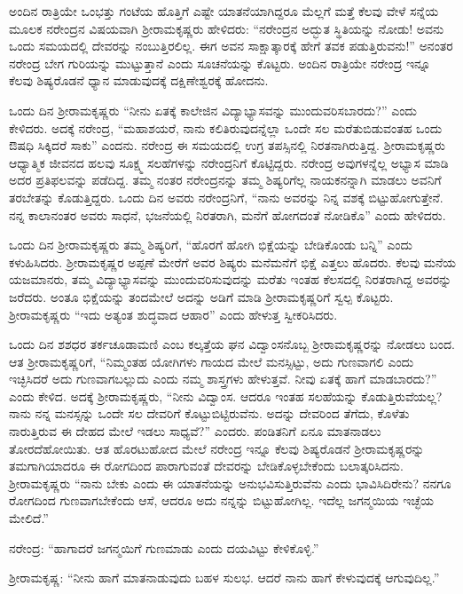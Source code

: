 ಅಂದಿನ ರಾತ್ರಿಯೇ ಒಂಭತ್ತು ಗಂಟೆಯ ಹೊತ್ತಿಗೆ ಎಷ್ಟೇ ಯಾತನೆಯಾಗಿದ್ದರೂ ಮೆಲ್ಲಗೆ ಮತ್ತೆ ಕೆಲವು ವೇಳೆ ಸನ್ನೆಯ ಮೂಲಕ ನರೇಂದ್ರನ ವಿಷಯವಾಗಿ ಶ‍್ರೀರಾಮಕೃಷ್ಣರು ಹೇಳಿದರು: “ನರೇಂದ್ರನ ಅದ್ಭುತ ಸ್ಥಿತಿಯನ್ನು ನೋಡು! ಅವನು ಒಂದು ಸಮಯದಲ್ಲಿ ದೇವರನ್ನು ನಂಬುತ್ತಿರಲಿಲ್ಲ. ಈಗ ಅವನ ಸಾಕ್ಷಾತ್ಕಾರಕ್ಕೆ ಹೇಗೆ ತವಕ ಪಡುತ್ತಿರುವನು!” ಅನಂತರ ನರೇಂದ್ರ ಬೇಗ ಗುರಿಯನ್ನು ಮುಟ್ಟುತ್ತಾನೆ ಎಂದು ಸೂಚನೆಯನ್ನು ಕೊಟ್ಟರು. ಅಂದಿನ ರಾತ್ರಿಯೇ ನರೇಂದ್ರ ಇನ್ನೂ ಕೆಲವು ಶಿಷ್ಯರೊಡನೆ ಧ್ಯಾನ ಮಾಡುವುದಕ್ಕೆ ದಕ್ಷಿಣೇಶ್ವರಕ್ಕೆ ಹೋದನು.

ಒಂದು ದಿನ ಶ‍್ರೀರಾಮಕೃಷ್ಣರು “ನೀನು ಏತಕ್ಕೆ ಕಾಲೇಜಿನ ವಿದ್ಯಾಭ್ಯಾಸವನ್ನು ಮುಂದುವರಿಸಬಾರದು?” ಎಂದು ಕೇಳಿದರು. ಅದಕ್ಕೆ ನರೇಂದ್ರ, “ಮಹಾಶಯರೆ, ನಾನು ಕಲಿತಿರುವುದನ್ನೆಲ್ಲಾ ಒಂದೇ ಸಲ ಮರೆತುಬಿಡುವಂತಹ ಒಂದು ಔಷಧಿ ಸಿಕ್ಕಿದರೆ ಸಾಕು” ಎಂದನು. ನರೇಂದ್ರ ಈ ಸಮಯದಲ್ಲಿ ಉಗ್ರ ತಪಸ್ಸಿನಲ್ಲಿ ನಿರತನಾಗಿರುತ್ತಿದ್ದ. ಶ‍್ರೀರಾಮಕೃಷ್ಣರು ಆಧ್ಯಾತ್ಮಿಕ ಜೀವನದ ಹಲವು ಸೂಕ್ಷ್ಮ ಸಲಹೆಗಳನ್ನು ನರೇಂದ್ರನಿಗೆ ಕೊಟ್ಟಿದ್ದರು. ನರೇಂದ್ರ ಅವುಗಳನ್ನೆಲ್ಲ ಅಭ್ಯಾಸ ಮಾಡಿ ಅದರ ಪ್ರತಿಫಲವನ್ನು ಪಡೆದಿದ್ದ. ತಮ್ಮ ನಂತರ ನರೇಂದ್ರನನ್ನು ತಮ್ಮ ಶಿಷ್ಯರಿಗೆಲ್ಲ ನಾಯಕನನ್ನಾಗಿ ಮಾಡಲು ಅವನಿಗೆ ತರಬೇತನ್ನು ಕೊಡುತ್ತಿದ್ದರು. ಒಂದು ದಿನ ಅವರು ನರೇಂದ್ರನಿಗೆ, “ನಾನು ಅವರನ್ನು ನಿನ್ನ ವಶಕ್ಕೆ ಬಿಟ್ಟುಹೋಗುತ್ತೇನೆ. ನನ್ನ ಕಾಲಾನಂತರ ಅವರು ಸಾಧನೆ, ಭಜನೆಯಲ್ಲಿ ನಿರತರಾಗಿ, ಮನೆಗೆ ಹೋಗದಂತೆ ನೋಡಿಕೊ” ಎಂದು ಹೇಳಿದರು.

ಒಂದು ದಿನ ಶ‍್ರೀರಾಮಕೃಷ್ಣರು ತಮ್ಮ ಶಿಷ್ಯರಿಗೆ, “ಹೊರಗೆ ಹೋಗಿ ಭಿಕ್ಷೆಯನ್ನು ಬೇಡಿಕೊಂಡು ಬನ್ನಿ” ಎಂದು ಕಳುಹಿಸಿದರು. ಶ‍್ರೀರಾಮಕೃಷ್ಣರ ಅಪ್ಪಣೆ ಮೇರೆಗೆ ಅವರ ಶಿಷ್ಯರು ಮನೆಮನೆಗೆ ಭಿಕ್ಷೆ ಎತ್ತಲು ಹೊದರು. ಕೆಲವು ಮನೆಯ ಯಜಮಾನರು, ತಮ್ಮ ವಿದ್ಯಾಭ್ಯಾಸವನ್ನು ಮುಂದುವರಿಸುವುದನ್ನು ಮರೆತು ಇಂತಹ ಕೆಲಸದಲ್ಲಿ ನಿರತರಾಗಿದ್ದ ಅವರನ್ನು ಜರೆದರು. ಅಂತೂ ಭಿಕ್ಷೆಯನ್ನು ತಂದಮೇಲೆ ಅದನ್ನು ಅಡಿಗೆ ಮಾಡಿ ಶ‍್ರೀರಾಮಕೃಷ್ಣರಿಗೆ ಸ್ವಲ್ಪ ಕೊಟ್ಟರು. ಶ‍್ರೀರಾಮಕೃಷ್ಣರು “ಇದು ಅತ್ಯಂತ ಶುದ್ಧವಾದ ಆಹಾರ” ಎಂದು ಹೇಳುತ್ತ ಸ್ವೀಕರಿಸಿದರು.

ಒಂದು ದಿನ ಶಶಧರ ತರ್ಕಚೂಡಾಮಣಿ ಎಂಬ ಕಲ್ಕತ್ತೆಯ ಘನ ವಿದ್ವಾಂಸನೊಬ್ಬ ಶ‍್ರೀರಾಮಕೃಷ್ಣರನ್ನು ನೋಡಲು ಬಂದ. ಆತ ಶ‍್ರೀರಾಮಕೃಷ್ಣರಿಗೆ, “ನಿಮ್ಮಂತಹ ಯೋಗಿಗಳು ಗಾಯದ ಮೇಲೆ ಮನಸ್ಸಿಟ್ಟು, ಅದು ಗುಣವಾಗಲಿ ಎಂದು ಇಚ್ಛಿಸಿದರೆ ಅದು ಗುಣವಾಗಬಲ್ಲುದು ಎಂದು ನಮ್ಮ ಶಾಸ್ತ್ರಗಳು ಹೇಳುತ್ತವೆ. ನೀವು ಏತಕ್ಕೆ ಹಾಗೆ ಮಾಡಬಾರದು?” ಎಂದು ಕೇಳಿದ. ಅದಕ್ಕೆ ಶ‍್ರೀರಾಮಕೃಷ್ಣರು, “ನೀನು ವಿದ್ವಾಂಸ. ಆದರೂ ಇಂತಹ ಸಲಹೆಯನ್ನು ಕೊಡುತ್ತಿರುವೆಯಲ್ಲ? ನಾನು ನನ್ನ ಮನಸ್ಸನ್ನು ಒಂದೇ ಸಲ ದೇವರಿಗೆ ಕೊಟ್ಟುಬಿಟ್ಟಿರುವೆನು. ಅದನ್ನು ದೇವರಿಂದ ತೆಗೆದು, ಕೊಳೆತು ನಾರುತ್ತಿರುವ ಈ ದೇಹದ ಮೇಲೆ ಇಡಲು ಸಾಧ್ಯವೆ?” ಎಂದರು. ಪಂಡಿತನಿಗೆ ಏನೂ ಮಾತನಾಡಲು ತೋರದೆಹೋಯಿತು. ಆತ ಹೊರಟುಹೋದ ಮೇಲೆ ನರೇಂದ್ರ ಇನ್ನೂ ಕೆಲವು ಶಿಷ್ಯರೊಡನೆ ಶ‍್ರೀರಾಮಕೃಷ್ಣರನ್ನು ತಮಗಾಗಿಯಾದರೂ ಈ ರೋಗದಿಂದ ಪಾರಾಗುವಂತೆ ದೇವರನ್ನು ಬೇಡಿಕೊಳ್ಳಬೇಕೆಂದು ಬಲಾತ್ಕರಿಸಿದನು. ಶ‍್ರೀರಾಮಕೃಷ್ಣರು “ನಾನು ಬೇಕು ಎಂದು ಈ ಯಾತನೆಯನ್ನು ಅನುಭವಿಸುತ್ತಿರುವೆನು ಎಂದು ಭಾವಿಸಿದಿರೇನು? ನನಗೂ ರೋಗದಿಂದ ಗುಣವಾಗಬೇಕೆಂದು ಆಸೆ, ಆದರೂ ಅದು ನನ್ನನ್ನು ಬಿಟ್ಟುಹೋಗಿಲ್ಲ. ಇದೆಲ್ಲ ಜಗನ್ಮಯಿಯ ಇಚ್ಛೆಯ ಮೇಲಿದೆ.”

ನರೇಂದ್ರ: “ಹಾಗಾದರೆ ಜಗನ್ಮಯಿಗೆ ಗುಣಮಾಡು ಎಂದು ದಯವಿಟ್ಟು ಕೇಳಿಕೊಳ್ಳಿ.”

ಶ‍್ರೀರಾಮಕೃಷ್ಣ: “ನೀನು ಹಾಗೆ ಮಾತನಾಡುವುದು ಬಹಳ ಸುಲಭ. ಆದರೆ ನಾನು ಹಾಗೆ ಕೇಳುವುದಕ್ಕೆ ಆಗುವುದಿಲ್ಲ.”

